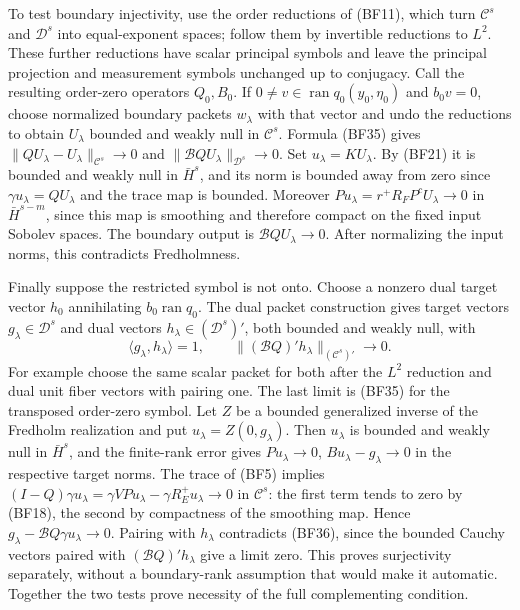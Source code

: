 \documentclass[
  11pt,
]{article}
\begin{document}
To test boundary injectivity, use the order reductions of (BF11), which
turn \(\mathcal C^s\) and \(\mathcal D^s\) into equal-exponent spaces;
follow them by invertible reductions to \(L^2\). These further
reductions have scalar principal symbols and leave the principal
projection and measurement symbols unchanged up to conjugacy. Call the
resulting order-zero operators \(Q_0,B_0\). If
\(0\ne v\in\operatorname{ran}q_0(y_0,\eta_0)\) and \(b_0v=0\), choose
normalized boundary packets \(w_\lambda\) with that vector and undo the
reductions to obtain \(U_\lambda\) bounded and weakly null in
\(\mathcal C^s\). Formula (BF35) gives
\(\|QU_\lambda-U_\lambda\|_{\mathcal C^s}\to0\) and
\(\|\mathcal BQU_\lambda\|_{\mathcal D^s}\to0\). Set
\(u_\lambda=KU_\lambda\). By (BF21) it is bounded and weakly null in
\(\bar H^s\), and its norm is bounded away from zero since
\(\gamma u_\lambda=QU_\lambda\) and the trace map is bounded. Moreover
\(Pu_\lambda=r^+R_FP^cU_\lambda\to0\) in \(\bar H^{s-m}\), since this
map is smoothing and therefore compact on the fixed input Sobolev
spaces. The boundary output is \(\mathcal BQU_\lambda\to0\). After
normalizing the input norms, this contradicts Fredholmness.

Finally suppose the restricted symbol is not onto. Choose a nonzero dual
target vector \(h_0\) annihilating \(b_0\operatorname{ran}q_0\). The
dual packet construction gives target vectors
\(g_\lambda\in\mathcal D^s\) and dual vectors
\(h_\lambda\in(\mathcal D^s)'\), both bounded and weakly null, with \[
 \langle g_\lambda,h_\lambda\rangle=1,
 \qquad\|(\mathcal BQ)'h_\lambda\|_{(\mathcal C^s)'}\to0.
 \tag{BF36}
\] For example choose the same scalar packet for both after the \(L^2\)
reduction and dual unit fiber vectors with pairing one. The last limit
is (BF35) for the transposed order-zero symbol. Let \(Z\) be a bounded
generalized inverse of the Fredholm realization and put
\(u_\lambda=Z(0,g_\lambda)\). Then \(u_\lambda\) is bounded and weakly
null in \(\bar H^s\), and the finite-rank error gives
\(Pu_\lambda\to0\), \(Bu_\lambda-g_\lambda\to0\) in the respective
target norms. The trace of (BF5) implies
\((I-Q)\gamma u_\lambda=\gamma VPu_\lambda-\gamma R_E^+u_\lambda\to0\)
in \(\mathcal C^s\): the first term tends to zero by (BF18), the second
by compactness of the smoothing map. Hence
\(g_\lambda-\mathcal BQ\gamma u_\lambda\to0\). Pairing with
\(h_\lambda\) contradicts (BF36), since the bounded Cauchy vectors
paired with \((\mathcal BQ)'h_\lambda\) give a limit zero. This proves
surjectivity separately, without a boundary-rank assumption that would
make it automatic. Together the two tests prove necessity of the full
complementing condition.
\end{document}
